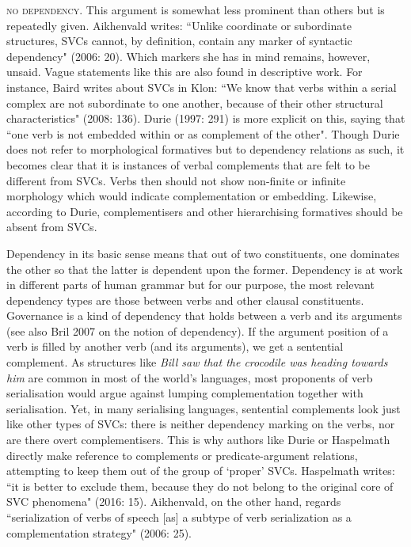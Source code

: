 \textsc{no dependency}. This argument is somewhat less prominent than others but is repeatedly given. Aikhenvald writes: ``Unlike coordinate or subordinate structures, SVCs cannot, by definition, contain any marker of syntactic dependency" (2006: 20). Which markers she has in mind remains, however, unsaid. Vague statements like this are also found in descriptive work. For instance, Baird writes about SVCs in Klon: ``We know that verbs within a serial complex are not subordinate to one another, because of their other structural characteristics" (2008: 136). Durie (1997: 291) is more explicit on this, saying that ``one verb is not embedded within or as complement of the other". Though Durie does not refer to morphological formatives but to dependency relations as such, it becomes clear that it is instances of verbal complements that are felt to be different from SVCs. Verbs then should not show non-finite or infinite morphology which would indicate complementation or embedding. Likewise, according to Durie, complementisers and other hierarchising formatives should be absent from SVCs. 

Dependency in its basic sense means that out of two constituents, one dominates the other so that the latter is dependent upon the former. Dependency is at work in different parts of human grammar but for our purpose, the most relevant dependency types are those between verbs and other clausal constituents. Governance is a kind of dependency that holds between a verb and its arguments (see also Bril 2007 on the notion of dependency). If the argument position of a verb is filled by another verb (and its arguments), we get a sentential complement. As structures like \textit{Bill saw that the crocodile was heading towards him} are common in most of the world's languages, most proponents of verb serialisation would argue against lumping complementation together with serialisation. Yet, in many serialising languages, sentential complements look just like other types of SVCs: there is neither dependency marking on the verbs, nor are there overt complementisers. This is why authors like Durie or Haspelmath directly make reference to complements or predicate-argument relations, attempting to keep them out of the group of `proper' SVCs. Haspelmath writes: ``it is better to exclude them, because they do not belong to the original
core of SVC phenomena" (2016: 15). Aikhenvald, on the other hand, regards ``serialization of verbs of speech [as] a subtype of verb serialization as a complementation strategy" (2006: 25).   

